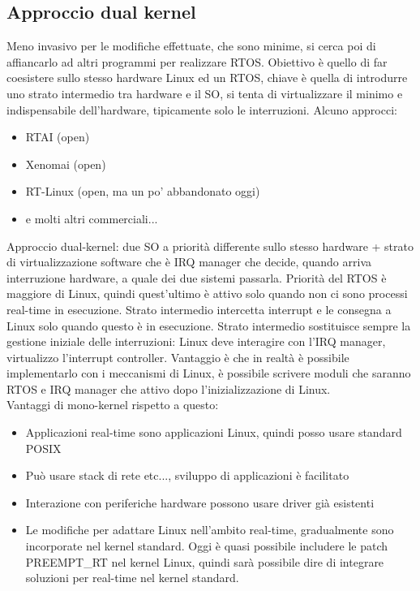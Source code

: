 \documentclass{article}
\begin{document}
\subsection{Approccio dual kernel}
Meno invasivo per le modifiche effettuate, che sono minime, si cerca poi di affiancarlo ad altri programmi per realizzare RTOS. Obiettivo è quello di far coesistere sullo stesso hardware Linux ed un RTOS, chiave è quella di introdurre uno strato intermedio tra hardware e il SO, si tenta di virtualizzare il minimo e indispensabile dell'hardware, tipicamente solo le interruzioni. Alcuno approcci:
\begin{itemize}
\item RTAI (open)
\item Xenomai (open)
\item RT-Linux (open, ma un po' abbandonato oggi)
\item e molti altri commerciali...
\end{itemize}
Approccio dual-kernel: due SO a priorità differente sullo stesso hardware +  strato di virtualizzazione software che è IRQ manager che decide, quando arriva interruzione hardware, a quale dei due sistemi passarla. Priorità del RTOS è maggiore di Linux, quindi quest'ultimo è attivo solo quando non ci sono processi real-time in esecuzione. Strato intermedio intercetta interrupt e le consegna a Linux solo quando questo è in esecuzione. Strato intermedio sostituisce sempre la gestione iniziale delle interruzioni: Linux deve interagire con l'IRQ manager, virtualizzo l'interrupt controller. Vantaggio è che in realtà è possibile implementarlo con i meccanismi di Linux, è possibile scrivere moduli che saranno RTOS e IRQ manager che attivo dopo l'inizializzazione di Linux.\\ Vantaggi di mono-kernel rispetto a questo:
\begin{itemize}
\item Applicazioni real-time sono applicazioni Linux, quindi posso usare standard POSIX
\item Può usare stack di rete etc..., sviluppo di applicazioni è facilitato
\item Interazione con periferiche hardware possono usare driver già esistenti
\item Le modifiche per adattare Linux nell'ambito real-time, gradualmente sono incorporate nel kernel standard. Oggi è quasi possibile includere le patch PREEMPT\_RT nel kernel Linux, quindi sarà possibile dire di integrare soluzioni per real-time nel kernel standard.
\end{itemize}
\end{document}
